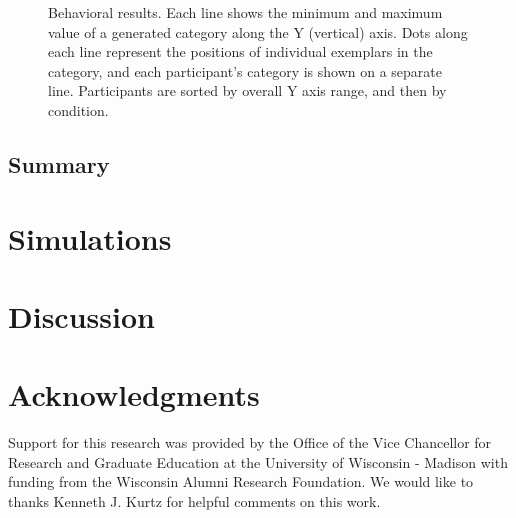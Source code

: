 \documentclass[10pt,letterpaper]{article}
\begin{document}
\begin{figure*}
    \begin{center}
    
    \caption{Behavioral results. Each line shows the minimum and maximum value of a generated category along the Y (vertical) axis. Dots along each line represent the positions of individual exemplars in the category, and each participant's category is shown on a separate line. Participants are sorted by overall Y axis range, and then by condition.}
    \label{fig:middle-bottom-yranges}
    \end{center}
\end{figure*}


\subsection{Summary}


\section{Simulations}
\section{Discussion}
\section{Acknowledgments}
Support for this research was provided by the Office of the Vice Chancellor for Research and Graduate Education at the University of Wisconsin - Madison with funding from the Wisconsin Alumni Research Foundation. We would like to thanks Kenneth J. Kurtz for helpful comments on this work.




\setlength{\bibleftmargin}{.025in}
\setlength{\bibindent}{-\bibleftmargin}

\end{document}
